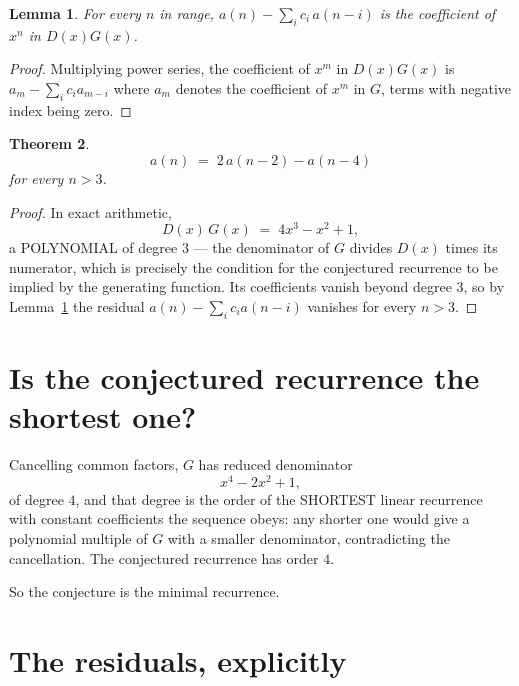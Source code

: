 \documentclass[11pt,a4paper]{article}
\theoremstyle{plain}
\newtheorem{theorem}{Theorem}
\newtheorem{lemma}[theorem]{Lemma}
\theoremstyle{definition}
\begin{document}
\begin{lemma}\label{lem:key}
For every $n$ in range, $a(n)-\sum_i c_i\,a(n-i)$ is the coefficient of $x^{n}$ in
$D(x)G(x)$.
\end{lemma}

\begin{proof}
Multiplying power series, the coefficient of $x^{m}$ in $D(x)G(x)$ is
$a_m-\sum_i c_i a_{m-i}$ where $a_m$ denotes the coefficient of $x^{m}$ in $G$, terms with
negative index being zero.
\end{proof}

\begin{theorem}
\[
a(n)\;=\;2\,a(n-2) - a(n-4)
\]
for every $n>3$.
\end{theorem}

\begin{proof}
In exact arithmetic,
\[
D(x)\,G(x)\;=\;4 x^{3} - x^{2} + 1,
\]
a POLYNOMIAL of degree $3$ --- the denominator of $G$ divides $D(x)$ times its numerator,
which is precisely the condition for the conjectured recurrence to be implied by the
generating function. Its coefficients vanish beyond degree $3$, so by
Lemma~\ref{lem:key} the residual $a(n)-\sum_ic_ia(n-i)$ vanishes for every
$n>3$.
\end{proof}

\section{Is the conjectured recurrence the shortest one?}

Cancelling common factors, $G$ has reduced denominator
\[
x^{4} - 2 x^{2} + 1,
\]
of degree $4$, and that degree is the order of the SHORTEST linear recurrence with
constant coefficients the sequence obeys: any shorter one would give a polynomial multiple of
$G$ with a smaller denominator, contradicting the cancellation. The conjectured recurrence has
order $4$.

So the conjecture is the minimal recurrence.

\section{The residuals, explicitly}
\end{document}

